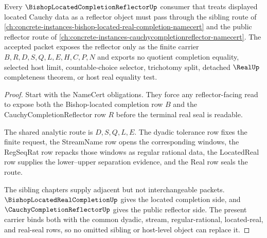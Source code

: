 \begin{theorem}
\label{thm:bishop-located-completion-reflector-route}
Every $\BishopLocatedCompletionReflectorUp$ consumer that treats displayed located Cauchy data as a reflector object must pass through the sibling route of \autoref{ch:concrete-instances-bishop-located-real-completion-namecert} and the public reflector route of \autoref{ch:concrete-instances-cauchycompletionreflector-namecert}. The accepted packet exposes the reflector only as the finite carrier $B,R,D,S,Q,L,E,H,C,P,N$ and exports no quotient completion equality, selected host limit, countable-choice selector, trichotomy split, detached $\RealUp$ completeness theorem, or host real equality test.
\end{theorem}
\begin{proof}
Start with the NameCert obligations. They force any reflector-facing read to expose both the Bishop-located completion row $B$ and the CauchyCompletionReflector row $R$ before the terminal real seal is readable.

The shared analytic route is $D,S,Q,L,E$. The dyadic tolerance row fixes the finite request, the StreamName row opens the corresponding windows, the RegSeqRat row repacks those windows as regular rational data, the LocatedReal row supplies the lower--upper separation evidence, and the Real row seals the route.

The sibling chapters supply adjacent but not interchangeable packets. $\BishopLocatedRealCompletionUp$ gives the located completion side, and $\CauchyCompletionReflectorUp$ gives the public reflector side. The present carrier binds both with the common dyadic, stream, regular-rational, located-real, and real-seal rows, so no omitted sibling or host-level object can replace it.
\end{proof}



